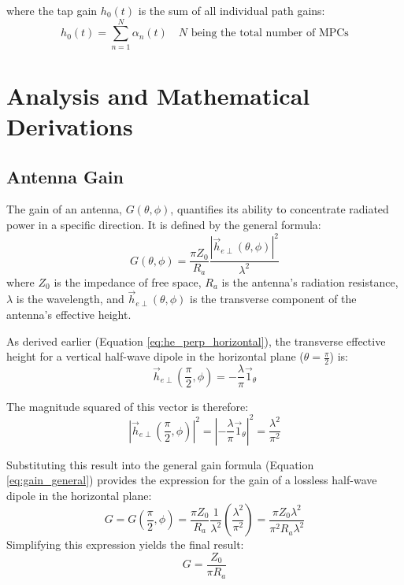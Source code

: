where the tap gain $h_0(t)$ is the sum of all individual path gains:
\begin{equation}
	\label{eq:narrow}
	\boxed{h_0(t) = \sum_{n=1}^{N} \alpha_n(t)} \quad N \text{ being the total number of MPCs}
\end{equation}

\section{Analysis and Mathematical Derivations}

\subsection{Antenna Gain}
The gain of an antenna, $G(\theta, \phi)$, quantifies its ability to concentrate radiated power in a specific direction. It is defined by the general formula:
\begin{equation}
	G(\theta,\phi) = \frac{\pi Z_0}{R_a} \frac{|\vec{h}_{e\perp}(\theta,\phi)|^2}{\lambda^2}
	\label{eq:gain_general}
\end{equation}
where $Z_0$ is the impedance of free space, $R_a$ is the antenna's radiation resistance, $\lambda$ is the wavelength, and $\vec{h}_{e\perp}(\theta,\phi)$ is the transverse component of the antenna's effective height.

As derived earlier (Equation \ref{eq:he_perp_horizontal}), the transverse effective height for a vertical half-wave dipole in the horizontal plane ($\theta = \frac{\pi}{2}$) is:
\begin{equation}
	\vec{h}_{e\perp}\left(\frac{\pi}{2},\phi\right) = -\frac{\lambda}{\pi}\vec{1}_{\theta}
\end{equation}

The magnitude squared of this vector is therefore:
\begin{equation}
	\left|\vec{h}_{e\perp}\left(\frac{\pi}{2},\phi\right)\right|^2 = \left|-\frac{\lambda}{\pi}\vec{1}_{\theta}\right|^2 = \frac{\lambda^2}{\pi^2}
\end{equation}

Substituting this result into the general gain formula (Equation \ref{eq:gain_general}) provides the expression for the gain of a lossless half-wave dipole in the horizontal plane:
\begin{equation}
	G = G\left(\frac{\pi}{2}, \phi\right) = \frac{\pi Z_0}{R_a} \frac{1}{\lambda^2} \left(\frac{\lambda^2}{\pi^2}\right) = \frac{\pi Z_0 \lambda^2}{\pi^2 R_a \lambda^2}
\end{equation}
Simplifying this expression yields the final result:
\begin{equation}
	G = \frac{Z_0}{\pi R_a}
	\label{eq:gain_derived}
\end{equation}

